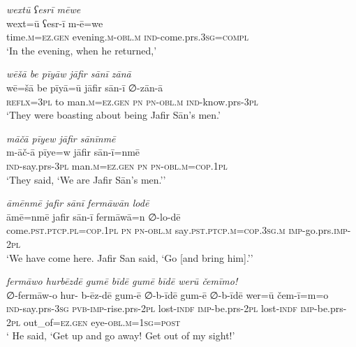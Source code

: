 \ea \label{ŠJ.27}
\textit{wextū ʕesrī mēwe} \\ 
\gll wext=ū ʕesr-ī m-ē=we \\ 
 time\textsc{.m}\textsc{=ez.gen} evening\textsc{.m}\textsc{-obl}\textsc{.m} \textsc{ind-}come.prs\textsc{.3sg}\textsc{=compl} \\ 
\glt `In the evening, when he returned,'
\z 
 
\ea \label{ŠJ.29}
\textit{wēšā be pīyāw jāfir sānī zānā} \\ 
\gll wē=šā be pīyā=ū jāfir sān-ī ∅-zān-ā \\ 
 \textsc{reflx}\textsc{=3pl} to man\textsc{.m}\textsc{=ez.gen} \textsc{pn} \textsc{pn}\textsc{-obl}\textsc{.m} \textsc{ind-}know.prs\textsc{-3pl} \\ 
\glt `They were boasting about being Jafir Sān’s men.'
\z 
 
\ea \label{ŠJ.34}
\textit{māčā pīyew jāfir sānīnmē} \\ 
\gll m-āč-ā pīye=w jāfir sān-ī=nmē \\ 
 \textsc{ind-}say.prs\textsc{-3pl} man\textsc{.m}\textsc{=ez.gen} \textsc{pn} \textsc{pn}\textsc{-obl}\textsc{.m}\textsc{=cop}\textsc{.\textsc{1pl}} \\ 
\glt `They said, ‘We are Jafir Sān’s men.’'
\z 
 
\ea \label{ŠJ.36}
\textit{āmēnmē jafir sānī fermāwān lodē} \\ 
\gll āmē=nmē jafir sān-ī fermāwā=n ∅-lo-dē \\ 
 come\textsc{.pst}\textsc{.ptcp}\textsc{.pl}\textsc{=cop}\textsc{.\textsc{1pl}} \textsc{pn} \textsc{pn}\textsc{-obl}\textsc{.m} say\textsc{.pst}\textsc{.ptcp}\textsc{.m}\textsc{=cop}\textsc{.3sg}\textsc{.m} \textsc{imp-}go.prs.\textsc{imp-}\textsc{2pl} \\ 
\glt `We have come here. Jafir San said, ‘Go [and bring him].’'
\z 
 
\ea \label{ŠJ.37}
\textit{fermāwo hurbēzdē gumē bīdē gumē bīdē werū čemīmo!} \\ 
\gll ∅-fermāw-o hur- b-ēz-dē gum-ē ∅-b-īdē gum-ē ∅-b-īdē wer=ū čem-ī=m=o \\ 
 \textsc{ind-}say.prs\textsc{-3sg} \textsc{pvb-}\textsc{imp-}rise.prs-\textsc{2pl} lost\textsc{-indf} \textsc{imp-}be.prs-\textsc{2pl} lost\textsc{-indf} \textsc{imp-}be.prs-\textsc{2pl} out\_of\textsc{=ez.gen} eye\textsc{-obl}\textsc{.m}\textsc{=\textsc{1sg}}\textsc{=\textsc{post}} \\ 
\glt ` He said, ‘Get up and go away! Get out of my sight!'
\z 
 
